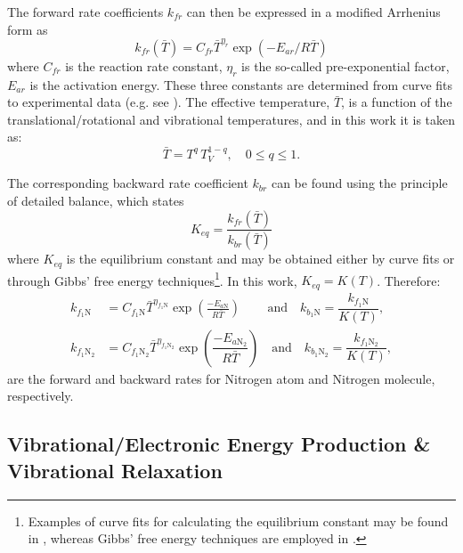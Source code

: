 \documentclass[10pt]{article}
\begin{document}
The forward rate coefficients  $k_{fr}$  can then be expressed in a modified Arrhenius form as
\begin{equation}\label{eq:equilibrium_constant}
  k_{fr}\left(\bar{T}\right) = C_{fr} \bar{T}^{\eta_r} \exp \left(-E_{ar}/R\bar{T}\right)
\end{equation}
where $C_{fr}$ is the reaction rate constant, $\eta_r$ is the so-called pre-exponential factor, $E_{ar}$ is the activation energy.  These three constants are determined from curve fits to experimental data (e.g. see \cite{Ait1996}). The effective temperature, $\bar{T}$, is a function of the translational/rotational and vibrational temperatures, and in this work it is taken as:
\begin{equation}
	\label{eq:Tbar}
\bar{T}=T^{q} \, T_V^{1-q}, \quad 0\leq q\leq 1 .
\end{equation}


The corresponding backward rate coefficient   $k_{br}$  can be found using the principle of detailed balance, which states
\begin{equation}
  K_{eq} = \frac{k_{fr}\left(\bar{T}\right)}{k_{br}\left(\bar{T}\right)}
\end{equation}
where $K_{eq}$ is the equilibrium constant and may be obtained either by curve fits or through Gibbs' free energy techniques\footnote{Examples of curve fits for calculating the equilibrium constant may be found in \citet{Park1990}, whereas Gibbs' free energy techniques are employed in \citet{Nasa_chemistry}. }. 
In this work, $K_{eq}=K(T)$. 
%
Therefore:
\begin{equation}
 \begin{split}
\label{eq:forward_rates1}
k_{f_1 \text{N}} &= C_{f_1 \text{N}} \bar{T}^{\eta_{f_1 \text{N}}} \exp\left(\frac{-E_{a\text{N}}}{R \bar{T}}\right) \qquad \,\mbox{and}\quad k_{b_1 \text{N}} = \dfrac{k_{f_1 \text{N}}}{K(T)},\\
%
k_{f_1 \text{N}_2} &= C_{f_1 \text{N}_2} \bar{T}^{\eta_{f_1 \text{N}_2}} \exp\left(\dfrac{-E_{a\text{N}_2}}{R \bar{T}}\right) \quad \mbox{and}\quad k_{b_1 \text{N}_2} = \dfrac{k_{f_1 \text{N}_2}}{K(T)},
%
 \end{split}
\end{equation}
are the forward and backward rates for Nitrogen atom and Nitrogen molecule, respectively.


\subsection{Vibrational/Electronic Energy Production \& Vibrational Relaxation}\label{sec:omega_v}
\end{document}
